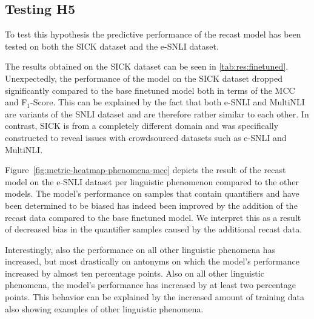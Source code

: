 \subsection{Testing H5}
To test this hypothesis the predictive performance of the recast model has been tested on both the \ac{SICK} dataset and the \ac{e-SNLI} dataset.

The results obtained on the \ac{SICK} dataset can be seen in \autoref{tab:res:finetuned}. Unexpectedly, the performance of the model on the \ac{SICK} dataset dropped significantly compared to the base finetuned model both in terms of the \ac{MCC} and F$_1$-Score. This can be explained by the fact that both \ac{e-SNLI} and \ac{MultiNLI} are variants of the \ac{SNLI} dataset and are therefore rather similar to each other. In contrast, \ac{SICK} is from a completely different domain and was specifically constructed to reveal issues with crowdsourced datasets such as \ac{e-SNLI} and \ac{MultiNLI}.

Figure~\ref{fig:metric-heatmap-phenomena-mcc} depicts the result of the recast model on the \ac{e-SNLI} dataset per linguistic phenomenon compared to the other models. The model's performance on samples that contain quantifiers and have been determined to be biased has indeed been improved by the addition of the recast data compared to the base finetuned model. We interpret this as a result of decreased bias in the quantifier samples caused by the additional recast data.

Interestingly, also the performance on all other linguistic phenomena has increased, but most drastically on antonyms on which the model's performance increased by almost ten percentage points. Also on all other linguistic phenomena, the model's performance has increased by at least two percentage points. This behavior can be explained by the increased amount of training data also showing examples of other linguistic phenomena.
